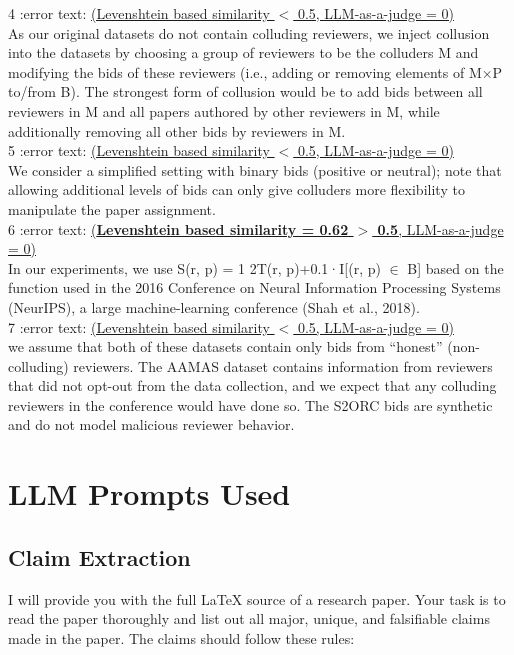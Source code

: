 \documentclass{article}
\newcommand{\grok}{\texttt{Grok 4}}
\begin{document}
\begin{appendix}
\begin{tcolorbox}[breakable,colback=black!5!white,colframe=black!20!white,title=\textbf{\textcolor{black}{Succeeded Identification using \grok}}]
4 :error text: \underline{(Levenshtein based similarity $<$ 0.5, LLM-as-a-judge = 0)}\\
As our original datasets do not contain colluding reviewers, we inject collusion into the datasets by choosing a group of reviewers to be the colluders M and modifying the bids of these reviewers (i.e., adding or removing elements of M×P to/from B). The strongest form of collusion would be to add bids between all reviewers in M and all papers authored by other reviewers in M, while additionally removing all other bids by reviewers in M.\\

5 :error text: \underline{(Levenshtein based similarity $<$ 0.5, LLM-as-a-judge = 0)}\\
We consider a simplified setting with binary bids (positive or neutral); note that allowing additional levels of bids can only give colluders more flexibility to manipulate the paper assignment.\\

6 :error text: \underline{(\textbf{Levenshtein based similarity = 0.62 $>$ 0.5}, LLM-as-a-judge = 0)}\\
In our experiments, we use S(r, p) = 1 2T(r, p)+0.1·I[(r, p) $\in$ B] based on the function used in the 2016 Conference on Neural Information Processing Systems (NeurIPS), a large machine-learning conference (Shah et al., 2018).\\

7 :error text: \underline{(Levenshtein based similarity $<$ 0.5, LLM-as-a-judge = 0)}\\
we assume that both of these datasets contain only bids from ``honest” (non-colluding) reviewers. The AAMAS dataset contains information from reviewers that did not opt-out from the data collection, and we expect that any colluding reviewers in the conference would have done so. The S2ORC bids are synthetic and do not model malicious reviewer behavior.
\end{tcolorbox}
\section{LLM Prompts Used}
\subsection{Claim Extraction}
\begin{tcolorbox}[breakable, colback=black!5!white,colframe=black!20!white,title=\textbf{\textcolor{black}{Claim Extraction Prompt}}]\label{appendix:claim_extraction}
\small
    I will provide you with the full LaTeX source of a research paper. Your task is to read the paper thoroughly and list out all major, unique, and falsifiable claims made in the paper. The claims should follow these rules:\\


\end{tcolorbox}
\end{appendix}
\end{document}

